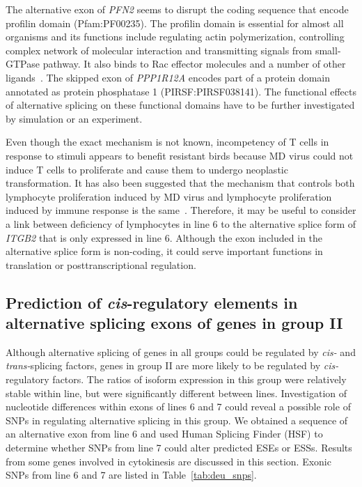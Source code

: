 \documentclass[10pt]{article}
\begin{document}
The alternative exon of {\em PFN2} seems to disrupt the coding sequence that
encode profilin domain (Pfam:PF00235).  The profilin domain is essential for
almost all organisms and its functions include regulating actin polymerization,
controlling complex network of molecular interaction and transmitting signals
from small-GTPase pathway.  It also binds to Rac effector molecules and a number
of other ligands~\cite{witke2004role}.  The skipped exon of {\em PPP1R12A}
encodes part of a protein domain annotated as protein phosphatase 1
(PIRSF:PIRSF038141).  The functional effects of alternative splicing on these
functional domains have to be further investigated by simulation or an
experiment.

Even though the exact mechanism is not known, incompetency of T cells in
response to stimuli appears to benefit resistant birds because MD virus could
not induce T cells to proliferate and cause them to undergo neoplastic
transformation.  It has also been suggested that the mechanism that controls
both lymphocyte proliferation induced by MD virus and lymphocyte proliferation
induced by immune response is the same~\cite{pazderka1975histocompatibility}.
Therefore, it may be useful to consider a link between deficiency of lymphocytes
in line 6 to the alternative splice form of {\em ITGB2} that is only expressed
in line 6.  Although the exon included in the alternative splice form is
non-coding, it could serve important functions in translation or
posttranscriptional regulation.



\subsection*{Prediction of {\em cis}-regulatory elements in alternative
splicing exons of genes in group II}

Although alternative splicing of genes in all groups could be regulated by {\em
cis-} and {\em trans-}splicing factors, genes in group II are more likely to be
regulated by {\em cis-}regulatory factors.  The ratios of isoform expression in
this group were relatively stable within line, but were significantly different
between lines.  Investigation of nucleotide differences within exons of lines 6
and 7 could reveal a possible role of SNPs in regulating alternative splicing in
this group.  We obtained a sequence of an alternative exon from line 6 and used
Human Splicing Finder (HSF) to determine whether SNPs from line 7 could alter
predicted ESEs or ESSs.  Results from some genes involved in cytokinesis are
discussed in this section.  Exonic SNPs from line 6 and 7 are listed in
Table~\ref{tab:deu_snps}.
\end{document}
